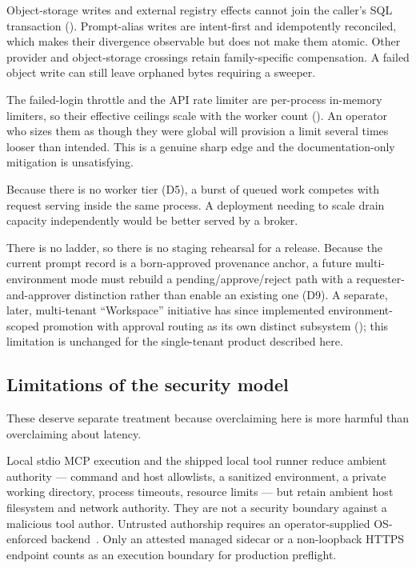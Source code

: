  Object-storage writes and
external registry effects cannot join the caller's SQL transaction
(). Prompt-alias writes are intent-first and idempotently
reconciled, which makes their divergence observable but does not make them atomic.
Other provider and object-storage crossings retain family-specific compensation. A
failed object write can still leave orphaned bytes requiring a sweeper.

 The failed-login throttle and the API rate
limiter are per-process in-memory limiters, so their effective ceilings scale with the
worker count (). An operator who sizes them as though they were
global will provision a limit several times looser than intended. This is a genuine
sharp edge and the documentation-only mitigation is unsatisfying.

 Because there is no worker tier
(D5), a burst of queued work competes with request serving inside the same process.
A deployment needing to scale drain capacity independently would be better served by
a broker.

 There is no
\arrowto{}\arrowto{} ladder, so there is no staging
rehearsal for a release. Because the current prompt record is a born-approved
provenance anchor, a future multi-environment mode must rebuild a
pending/approve/reject path with a requester-and-approver distinction rather than
enable an existing one (D9). A separate, later, multi-tenant ``Workspace''
initiative has since implemented environment-scoped promotion with approval
routing as its own distinct subsystem (); this limitation is
unchanged for the single-tenant product described here.

\subsection{Limitations of the security model}

These deserve separate treatment because overclaiming here is more harmful than
overclaiming about latency.

 Local stdio MCP execution and the shipped local
tool runner reduce ambient authority --- command and host allowlists, a sanitized
environment, a private working directory, process timeouts, resource limits --- but
retain ambient host filesystem and network authority. They are not a security
boundary against a malicious tool author. Untrusted authorship requires an
operator-supplied OS-enforced backend~\cite{agache2020firecracker,bubblewrap}. Only
an attested managed sidecar or a non-loopback HTTPS endpoint counts as an execution
boundary for production preflight.

